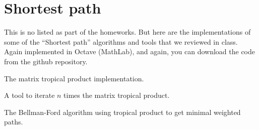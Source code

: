 \chapter{Shortest path}
\normalfont
This is no listed as part of the homeworks. But here are the implementations of some of the ``Shortest path'' algorithms and tools
that we reviewed in class. Again implemented in Octave (MathLab), and again, you can download the code from the github repository. \pn

The matrix tropical product implementation.
\ttfamily   

\normalfont

A tool to iterate $n$ times the matrix tropical product.
\ttfamily 

\normalfont

The Bellman-Ford algorithm using tropical product to get minimal weighted paths.
\ttfamily 

\normalfont

\itshape

